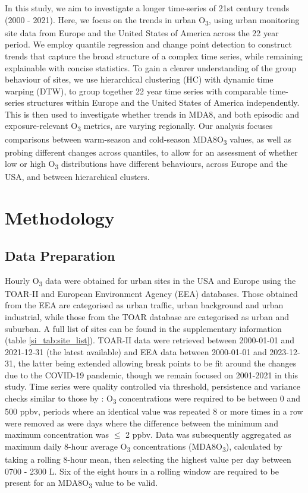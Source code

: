 \documentclass[journal abbreviation, manuscript]{copernicus}
\begin{document}
In this study, we aim to investigate a longer time-series of 21st century trends (2000 - 2021). Here, we focus on the trends in urban O\textsubscript{3}, using urban monitoring site data from Europe and the United States of America across the 22 year period. We employ quantile regression and change point detection to construct trends that capture the broad structure of a complex time series, while remaining explainable with concise statistics. To gain a clearer understanding of the group behaviour of sites, we use hierarchical clustering (HC) with dynamic time warping (DTW), to group together 22 year time series with comparable time-series structures within Europe and the United States of America independently. This is then used to investigate whether trends in MDA8, and both episodic and exposure-relevant O\textsubscript{3} metrics, are varying regionally. Our analysis focuses comparisons between warm-season and cold-season MDA8O\textsubscript{3} values, as well as probing different changes across quantiles, to allow for an assessment of whether low or high O\textsubscript{3} distributions have different behaviours, across Europe and the USA, and between hierarchical clusters.

\section{Methodology} \label{sect:method}

\subsection{Data Preparation} \label{sect:data_prep}
Hourly O\textsubscript{3} data were obtained for urban sites in the USA and Europe using the TOAR-II \citep{toar_db} and European Environment Agency (EEA) \citep{eea_1, eea_2} databases. Those obtained from the EEA are categorised as urban traffic, urban background and urban industrial, while those from the TOAR database are categorised as urban and suburban. A full list of sites can be found in the supplementary information (table \ref{si_tab:site_list}).  TOAR-II data were retrieved between 2000-01-01 and 2021-12-31 (the latest available) and EEA data between 2000-01-01 and 2023-12-31, the latter being extended allowing break points to be fit around the changes due to the COVID-19 pandemic, though we remain focused on 2001-2021 in this study. Time series were quality controlled via threshold, persistence and variance checks similar to those by \cite{Wang2023}: O\textsubscript{3} concentrations were required to be between 0 and 500 ppbv, periods where an identical value was repeated 8 or more times in a row were removed as were days where the difference between the minimum and maximum concentration was $\leq$ 2 ppbv. Data was subsequently aggregated as  maximum daily 8-hour average O\textsubscript{3} concentrations (MDA8O\textsubscript{3}),  calculated by taking a rolling 8-hour mean, then selecting the highest value per day between 0700 - 2300 L. Six of the eight hours in a rolling window are required to be present for an MDA8O\textsubscript{3} value to be valid.
\end{document}
